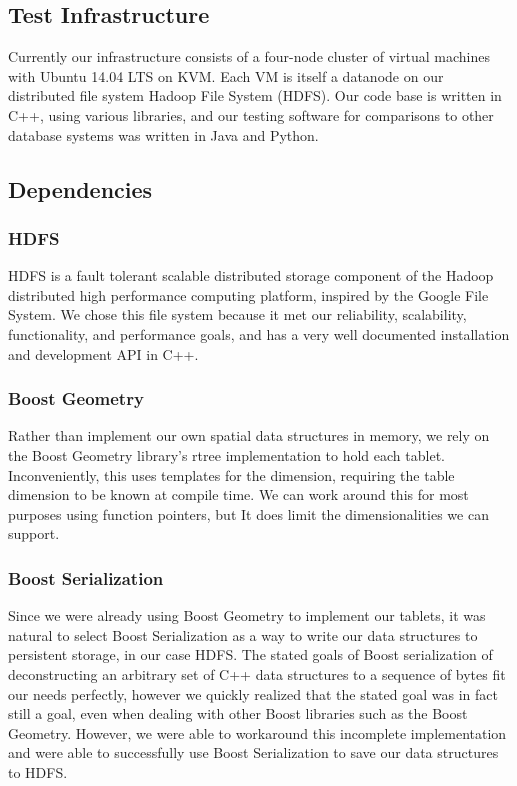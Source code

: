 \documentclass[11pt]{article}
\begin{document}
\subsection{Test Infrastructure}

Currently our infrastructure consists of a four-node cluster of virtual machines with Ubuntu 14.04 LTS on KVM. Each VM is itself a datanode on our distributed file system Hadoop File System (HDFS)\cite{hdfs}. Our code base is written in C++, using various libraries, and our testing software for comparisons to other database systems was written in Java and Python.

\subsection{Dependencies}

\subsubsection{HDFS}

HDFS is a fault tolerant scalable distributed storage component of the Hadoop distributed high performance computing platform, inspired by the Google File System. We chose this file system because it met our reliability, scalability, functionality, and performance goals, and has a very well documented installation and development API in C++. 

\subsubsection{Boost Geometry}

Rather than implement our own spatial data structures in memory, we rely on the Boost Geometry\cite{boost} library's rtree implementation to hold each tablet. Inconveniently, this uses templates for the dimension, requiring the table dimension to be known at compile time. We can work around this for most purposes using function pointers, but It does limit the dimensionalities we can support.

\subsubsection{Boost Serialization}

Since we were already using Boost Geometry to implement our tablets, it was natural to select Boost Serialization as a way to write our data structures to persistent storage, in our case HDFS. The stated goals of Boost serialization of deconstructing an arbitrary set of C++ data structures to a sequence of bytes fit our needs perfectly, however we quickly realized that the stated goal was in fact still a goal, even when dealing with other Boost libraries such as the Boost Geometry. However, we were able to workaround this incomplete implementation and were able to successfully use Boost Serialization to save our data structures to HDFS.
\end{document}

